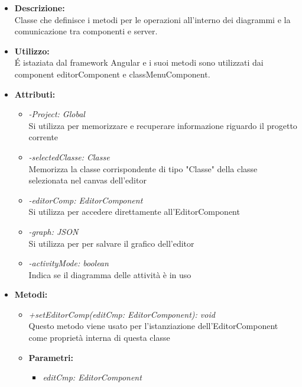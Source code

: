 				\begin{itemize}
          			\item \textbf{Descrizione:}\\
          			Classe che definisce i metodi per le operazioni all’interno dei diagrammi e la comunicazione tra componenti e server.
          			\item \textbf{Utilizzo:}\\
          			É istaziata dal framework Angular e i suoi metodi sono utilizzati dai component editorComponent e classMenuComponent.
          			\item \textbf{Attributi:}\\
          			\begin{itemize}
          				\item \emph{-Project: Global}\\
          				Si utilizza per memorizzare e recuperare informazione riguardo il progetto corrente
          				\item \emph{-selectedClasse: Classe}\\
          				Memorizza la classe corrispondente di tipo "Classe" della classe selezionata nel canvas dell'editor
          				\item \emph{-editorComp: EditorComponent}\\
          				Si utilizza per accedere direttamente all'EditorComponent
          				\item \emph{-graph: JSON}\\
          				Si utilizza per per salvare il grafico dell'editor
          				\item \emph{-activityMode: boolean}\\
          				Indica se il diagramma delle attività è in uso
          			\end{itemize}
          			\item \textbf{Metodi:}\\
          			\begin{itemize}
          				\item \emph{+setEditorComp(editCmp: EditorComponent): void}\\
          				Questo metodo viene usato per l'istanziazione dell'EditorComponent come proprietà interna di questa classe
          				\item \textbf{Parametri:}\\
            				\begin{itemize}
            					\item \emph{editCmp: EditorComponent}\\

\end{itemize}
\end{itemize}
\end{itemize}
